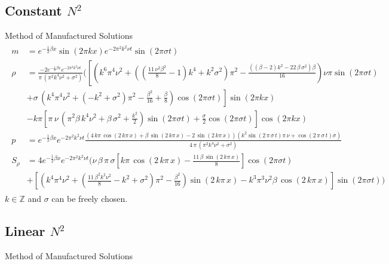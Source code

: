 \documentclass{article}
\begin{document}
\subsection{Constant $N^2$}
Method of Manufactured Solutions
\begin{align} \begin{split}
	m &= e^{-\frac{1}{2}\beta x} \sin(2\pi k x) e^{-2\pi^2k^2\nu t} \sin(2 \pi \sigma t) \\
	\rho &=  \frac {-2 e^{-\frac{1}{2}\beta x} e^{-2\pi^2k^2\nu t} }{\pi\, \left( {\pi}^{2}{k}^{4}{\nu}^{2}+{\sigma}^{2} \right) } \Big( \left[
	\left({k}^{6}{\pi}^{4}{\nu}^{2}+ \left(  \left( {\frac {11\,{\nu}^{2}{\beta}
^{2}}{8}}-1 \right) {k}^{4}+{k}^{2}{\sigma}^{2} \right) {\pi}^{2}-{
\frac { \left(  \left( \beta-2 \right) {k}^{2}-22\,\beta\,{\sigma}^{2}
 \right) \beta}{16}}\right) \nu \pi \sin(2\pi\sigma t) \right. \\
 &\left. + \sigma\, \left( {k}^{4}{\pi}^{4}{\nu}^{2}+ \left( -{k}^{2}+{\sigma}^{2
} \right) {\pi}^{2}-{\frac {{\beta}^{2}}{16}}+{\frac {\beta}{8}}
 \right) \cos(2 \pi \sigma t) \right] \sin(2 \pi k x) \\
 &- k \pi \left[
 \pi\,\nu\, \left( {\pi}^{2}\beta\,{k}^{4}{\nu}^{2}+\beta\,{\sigma}^{2}
+{\frac {{k}^{2}}{2}} \right) 
 \sin (2 \pi \sigma t) +  \frac{\sigma}{2} \cos(2\pi \sigma t) \right] \cos(2\pi k x) \\
	p &= e^{-\frac{1}{2}\beta x} e^{-2\pi^2k^2\nu t} {\frac { \left( 4\,k\pi\,\cos \left( 2\,k\pi\,x \right) +\beta\,\sin
 \left( 2\,k\pi\,x \right) -2\,\sin \left( 2\,k\pi\,x \right) 
 \right)  \left( {k}^{2}\sin \left( 2\,\pi\,\sigma\,t \right) \pi\,\nu
+\cos \left( 2\,\pi\,\sigma\,t \right) \sigma \right) }{4\,\pi\,
 \left( {\pi}^{2}{k}^{4}{\nu}^{2}+{\sigma}^{2} \right) }}
 \\
	S_\rho &=4 e^{-\frac{1}{2}\beta x} e^{-2\pi^2k^2\nu t} \Big(  \nu\,\beta\,\pi\,\sigma \left[ k\pi\,\cos \left( 2\,k\pi\,x \right) -{\frac {11\,\beta\,\sin
 \left( 2\,k\pi\,x \right) }{8}} \right] \cos (2\pi \sigma t)  \\
	&+  \left[\left( {k}^{4}{\pi}^{4}{\nu}^{2}+ \left( {\frac {11\,{\beta}^{2}{k}^{
2}{\nu}^{2}}{8}}-{k}^{2}+{\sigma}^{2} \right) {\pi}^{2}-{\frac {{\beta
}^{2}}{16}} \right) \sin \left( 2\,k\pi\,x \right) -{k}^{3}{\pi}^{3}{
\nu}^{2}\beta\,\cos \left( 2\,k\pi\,x \right) \right] \sin (2\pi \sigma t)	 \Big)
\end{split} \end{align}
$k \in \mathbb{Z}$ and $\sigma$ can be freely chosen. 
\subsection{Linear $N^2$}
Method of Manufactured Solutions
\end{document}
